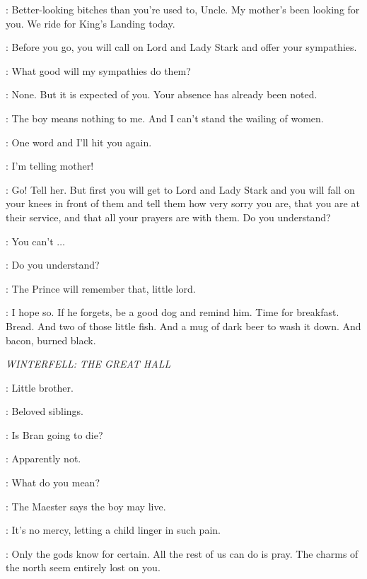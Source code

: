 \JOFFREY: Better-looking bitches than you're used to, Uncle. My mother's been looking for you. We ride for King's Landing today. 

\TYRION: Before you go, you will call on Lord and Lady Stark and offer your sympathies. 

\JOFFREY: What good will my sympathies do them? 

\TYRION: None. But it is expected of you. Your absence has already been noted. 

\JOFFREY: The boy means nothing to me. And I can't stand the wailing of women. 


\TYRION: One word and I'll hit you again. 

\JOFFREY: I'm telling mother! 


\TYRION: Go! Tell her. But first you will get to Lord and Lady Stark and you will fall on your knees in front of them and tell them how very sorry you are, that you are at their service, and that all your prayers are with them. Do you understand? 

\JOFFREY: You can't $\ldots$ 

\TYRION: Do you understand? 


\HOUND: The Prince will remember that, little lord. 

\TYRION: I hope so. If he forgets, be a good dog and remind him. Time for breakfast. Bread. And two of those little fish. And a mug of dark beer to wash it down. And bacon, burned black. 

\scene

\textit{WINTERFELL: THE GREAT HALL}


\JAIME: Little brother. 

\TYRION: Beloved siblings. 

\MYRCELLA: Is Bran going to die? 

\TYRION: Apparently not. 

\CERSEI: What do you mean? 

\TYRION: The Maester says the boy may live. 

\CERSEI: It's no mercy, letting a child linger in such pain. 

\TYRION: Only the gods know for certain. All the rest of us can do is pray. The charms of the north seem entirely lost on you. 

